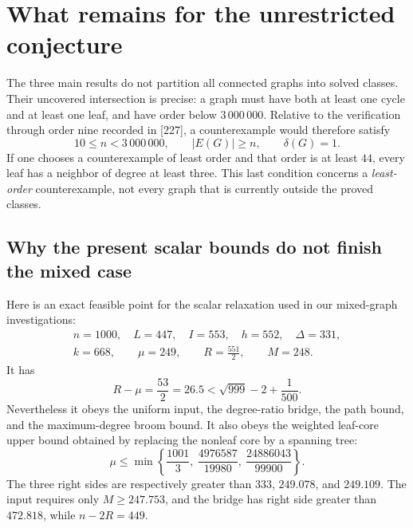 \documentclass[11pt,a4paper]{article}
\theoremstyle{remark}
\numberwithin{equation}{section}
\begin{document}
\section{What remains for the unrestricted conjecture}
\label{sec:new-remaining}

The three main results do not partition all connected graphs into solved
classes. Their uncovered intersection is precise: a graph must have both
at least one cycle and at least one leaf, and have order below
$3\,000\,000$. Relative to the verification through order nine recorded
in [227], a counterexample would therefore satisfy
\[
 10\le n<3\,000\,000,\qquad
 |E(G)|\ge n,\qquad \delta(G)=1.
\]
If one chooses a counterexample of least order and that order is at
least $44$, every leaf has a neighbor of degree at least three.
This last condition concerns a \emph{least-order} counterexample, not
every graph that is currently outside the proved classes.

\subsection{Why the present scalar bounds do not finish the mixed case}

Here is an exact feasible point for the scalar relaxation used in our
mixed-graph investigations:
\[
\begin{gathered}
 n=1000,\quad L=447,\quad I=553,\quad h=552,\quad \Delta=331,\\
 k=668,\qquad \mu=249,\qquad R=\frac{551}{2},\qquad M=248.
\end{gathered}
\]
It has
\[
 R-\mu=\frac{53}{2}=26.5
 <\sqrt{999}-2+\frac1{500}.
\]
Nevertheless it obeys the uniform input, the degree-ratio bridge,
the path bound, and the maximum-degree broom bound. It also obeys the
weighted leaf-core upper bound obtained by replacing the nonleaf
core by a spanning tree:
\[
 \mu\le\min\left\{
 \frac{1001}{3},\
 \frac{4976587}{19980},\
 \frac{24886043}{99900}
 \right\}.
\]
The three right sides are respectively greater than $333$, $249.078$,
and $249.109$. The input requires only $M\ge247.753$, and the bridge
has right side greater than $472.818$, while $n-2R=449$.
\end{document}
